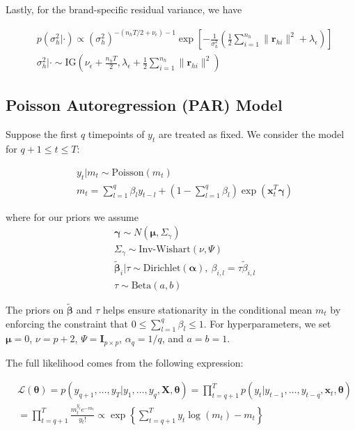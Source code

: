 \documentclass{article}
\begin{document}
\noindent Lastly, for the brand-specific residual variance, we have

\begin{align*}
    & p(\sigma_h^2|\cdot)\propto (\sigma_h^2)^{-(n_h T/2+\nu_{\epsilon})-1} \exp\left[-\frac{1}{\sigma_h^2} \left(\frac{1}{2}\sum_{i=1}^{n_h} \|\mathbf{r}_{hi}\|^2+\lambda_{\epsilon}\right)\right] \\
    & \sigma_h^2|\cdot \sim \text{IG}\left(\nu_{\epsilon}+\frac{n_h T}{2}, \lambda_{\epsilon}+\frac{1}{2} \sum_{i=1}^{n_h} \|\mathbf{r}_{hi}\|^2 \right)
\end{align*}




\subsection*{Poisson Autoregression (PAR) Model}

\noindent Suppose the first $q$ timepoints of $y_t$ are treated as fixed. We consider the model for $q+1 \leq t \leq T$:

\begin{align*}
    & y_t | m_t \sim \text{Poisson}(m_t) \\
    & m_t =\sum_{l=1}^q \beta_{l} y_{t-l} + \left(1-\sum_{l=1}^q \beta_l \right) \exp(\mathbf{x}_t^T \boldsymbol{\gamma})
\end{align*}

\noindent where for our priors we assume
\begin{align*}
    & \boldsymbol{\gamma} \sim N(\boldsymbol{\mu}, \Sigma_{\gamma}) \\
    & \Sigma_{\gamma} \sim \text{Inv-Wishart}(\nu, \Psi)\\
    & \tilde{\boldsymbol{\beta}}_i | \tau \sim \text{Dirichlet}(\boldsymbol{\alpha}), \ \beta_{i,l}=\tau \tilde{\beta}_{i,l} \\
    & \tau \sim \text{Beta}(a,b)
\end{align*}

\noindent The priors on $\tilde{\boldsymbol{\beta}}$ and $\tau$ helps ensure stationarity in the conditional mean $m_t$ by enforcing the constraint that $0 \leq \sum_{l=1}^q \beta_l \leq 1$. For hyperparameters, we set $\boldsymbol{\mu}=0$, $\nu=p+2$, $\Psi=\mathbf{I}_{p \times p}$, $\alpha_q=1/q$, and $a=b=1$.

\noindent The full likelihood comes from the following expression:

\begin{align*}
    & \mathcal{L}(\boldsymbol{\theta})=p(y_{q+1},\ldots,y_T|y_1,\ldots,y_q, \mathbf{X}, \boldsymbol{\theta})=\prod_{t=q+1}^T p(y_t|y_{t-1},\ldots,y_{t-q}, \mathbf{x}_t, \boldsymbol{\theta}) \\
    & = \prod_{t=q+1}^T \frac{m_t^{y_t} e^{-m_t}}{y_t!} \propto \exp\left\{\sum_{t=q+1}^T y_t \log(m_t) -m_t\right\}
\end{align*}
\end{document}
